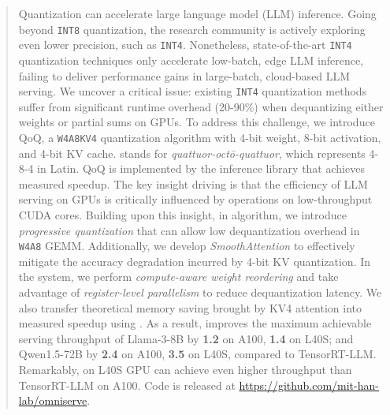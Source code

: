 
\begin{abstract}

Quantization can accelerate large language model (LLM) inference. Going beyond \texttt{INT8} quantization, the research community is actively exploring even lower precision, such as \texttt{INT4}. Nonetheless, state-of-the-art \texttt{INT4} quantization techniques only accelerate low-batch, edge LLM inference, failing to deliver performance gains in large-batch, cloud-based LLM serving. We uncover a critical issue: existing \texttt{INT4} quantization methods suffer from significant runtime overhead (20-90\%) when dequantizing either weights or partial sums on GPUs. To address this challenge, we introduce QoQ, a \texttt{W4A8KV4} quantization algorithm with 4-bit weight, 8-bit activation, and 4-bit KV cache. \algo stands for \textit{quattuor-octō-quattuor}, which represents 4-8-4 in Latin. QoQ is implemented by the \system inference library that achieves measured speedup. The key insight driving  \system is that the efficiency of LLM serving on GPUs is critically influenced by operations on low-throughput CUDA cores. Building upon this insight, in \algo algorithm, we introduce \textit{progressive quantization} that can allow low dequantization overhead in \texttt{W4A8} GEMM. Additionally, we develop \textit{SmoothAttention} to effectively mitigate the accuracy degradation incurred by 4-bit KV quantization. In the \system system, we perform \textit{compute-aware weight reordering} and take advantage of \textit{register-level parallelism} to reduce dequantization latency. We also transfer theoretical memory saving brought by KV4 attention into measured speedup using \system. 
As a result, \system improves the maximum achievable serving throughput of Llama-3-8B by \textbf{1.2\x} on A100, \textbf{1.4\x} on L40S; and Qwen1.5-72B by \textbf{2.4\x} on A100, \textbf{3.5\x} on L40S, compared to TensorRT-LLM. Remarkably, \system on L40S GPU can achieve even higher throughput than TensorRT-LLM on A100. Code is released at \url{https://github.com/mit-han-lab/omniserve}. %

\end{abstract}
